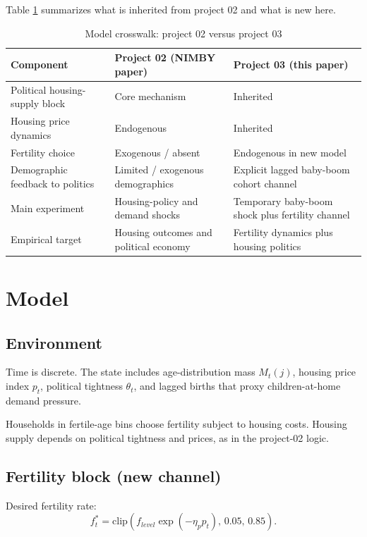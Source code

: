 \documentclass[11pt]{article}
\begin{document}
Table \ref{tab:crosswalk} summarizes what is inherited from project 02 and what is new here.

\begin{table}[h!]
\centering
\caption{Model crosswalk: project 02 versus project 03}
\label{tab:crosswalk}
\begin{tabular}{p{}p{}p{}}
\toprule
Component & Project 02 (NIMBY paper) & Project 03 (this paper) \\
\midrule
Political housing-supply block & Core mechanism & Inherited \\
Housing price dynamics & Endogenous & Inherited \\
Fertility choice & Exogenous / absent & Endogenous in new model \\
Demographic feedback to politics & Limited / exogenous demographics & Explicit lagged baby-boom cohort channel \\
Main experiment & Housing-policy and demand shocks & Temporary baby-boom shock plus fertility channel \\
Empirical target & Housing outcomes and political economy & Fertility dynamics plus housing politics \\
\bottomrule
\end{tabular}
\end{table}

\section{Model}

\subsection{Environment}

Time is discrete. The state includes age-distribution mass $M_t(j)$, housing price index $p_t$,
political tightness $\theta_t$, and lagged births that proxy children-at-home demand pressure.

Households in fertile-age bins choose fertility subject to housing costs. Housing supply depends
on political tightness and prices, as in the project-02 logic.

\subsection{Fertility block (new channel)}

Desired fertility rate:
\[
f_t^* = \text{clip}\left(f_{level}\exp(-\eta_p p_t),\,0.05,\,0.85\right).
\]
\end{document}
